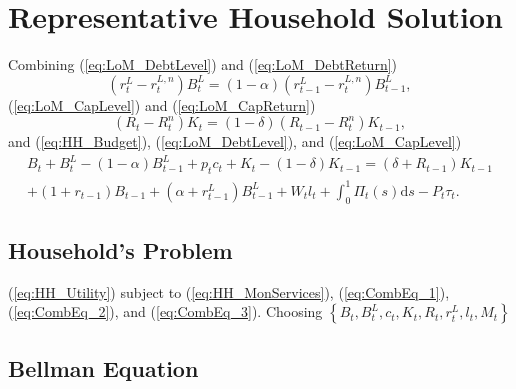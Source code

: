 \documentclass[11pt,a4paper,margin=1.5in]{article}
\begin{document}



\newpage
\appendix
{}
\section{Representative Household Solution}
\label{app:HH_Solution}

Combining (\ref{eq:LoM_DebtLevel}) and (\ref{eq:LoM_DebtReturn})
\begin{equation}
	\left(r^L_t-r^{L,n}_t\right)B^L_t = (1-\alpha)\left(r^L_{t-1}-r^{L,n}_t\right)B^L_{t-1},
	\label{eq:CombEq_1}
\end{equation}
(\ref{eq:LoM_CapLevel}) and (\ref{eq:LoM_CapReturn})
\begin{equation}
	\left(R_t-R^{n}_t\right)K_t = (1-\delta)\left(R_{t-1}-R^{n}_t\right)K_{t-1},
	\label{eq:CombEq_2}
\end{equation}
and (\ref{eq:HH_Budget}), (\ref{eq:LoM_DebtLevel}), and (\ref{eq:LoM_CapLevel})
\begin{multline}
	B_t + B^{L}_t - (1-\alpha)B^L_{t-1} + p_tc_t + K_t - (1-\delta)K_{t-1} = (\delta + R_{t-1})K_{t-1} \\+ (1+r_{t-1})B_{t-1} + (\alpha + r^L_{t-1})B^L_{t-1} + W_tl_t + \int^1_0\Pi_t(s)\text{d}s - P_t\tau_t.
	\label{eq:CombEq_3}
\end{multline}

\subsection{Household's Problem}
(\ref{eq:HH_Utility}) subject to (\ref{eq:HH_MonServices}), (\ref{eq:CombEq_1}), (\ref{eq:CombEq_2}), and (\ref{eq:CombEq_3}). Choosing 
$\left\{B_t, B^L_t, c_t, K_t, R_t, r^L_t, l_t, M_t\right\}$

\subsection{Bellman Equation}
\end{document}
